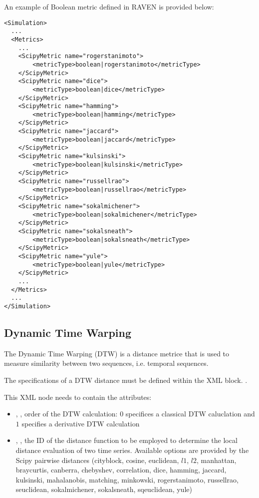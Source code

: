 An example of Boolean metric defined in RAVEN is provided below:
\begin{lstlisting}[style=XML]
<Simulation>
  ...
  <Metrics>
    ...
    <ScipyMetric name="rogerstanimoto">
        <metricType>boolean|rogerstanimoto</metricType>
    </ScipyMetric>
    <ScipyMetric name="dice">
        <metricType>boolean|dice</metricType>
    </ScipyMetric>
    <ScipyMetric name="hamming">
        <metricType>boolean|hamming</metricType>
    </ScipyMetric>
    <ScipyMetric name="jaccard">
        <metricType>boolean|jaccard</metricType>
    </ScipyMetric>
    <ScipyMetric name="kulsinski">
        <metricType>boolean|kulsinski</metricType>
    </ScipyMetric>
    <ScipyMetric name="russellrao">
        <metricType>boolean|russellrao</metricType>
    </ScipyMetric>
    <ScipyMetric name="sokalmichener">
        <metricType>boolean|sokalmichener</metricType>
    </ScipyMetric>
    <ScipyMetric name="sokalsneath">
        <metricType>boolean|sokalsneath</metricType>
    </ScipyMetric>
    <ScipyMetric name="yule">
        <metricType>boolean|yule</metricType>
    </ScipyMetric>
    ...
  </Metrics>
  ...
</Simulation>
\end{lstlisting}

\subsection{Dynamic Time Warping}
\label{subsection:DTW}
The Dynamic Time Warping (DTW) is a distance metrice that is used to measure similarity
between two sequences, i.e. temporal sequences.

The specifications of a DTW distance must be defined within the XML block.
.

This XML node needs to contain the attributes:


\begin{itemize}
  \item {},          ,    order of the DTW calculation: $0$ specifices a classical DTW caluclation and $1$ specifies
                                                                    a derivative DTW calculation
  \item {},  , the ID of the distance function to be employed to determine the local distance
                                                                    evaluation of two time series. Available options are provided by the Scipy
                                                                    pairwise distances (cityblock, cosine, euclidean, $l1$, $l2$, manhattan,
                                                                    braycurtis, canberra, chebyshev, correlation, dice, hamming, jaccard,
                                                                    kulsinski, mahalanobis, matching, minkowski, rogerstanimoto, russellrao,
                                                                    seuclidean, sokalmichener, sokalsneath, sqeuclidean, yule)
\end{itemize}

